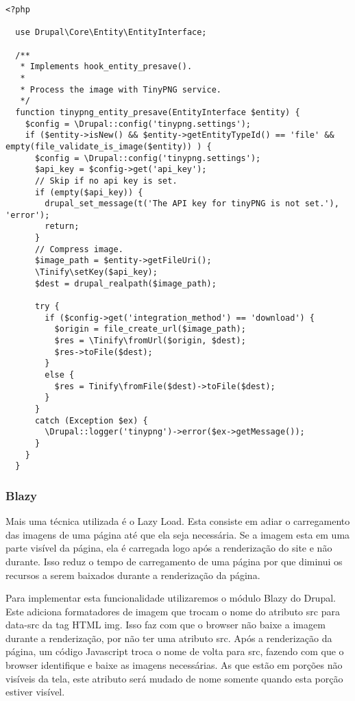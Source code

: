 \documentclass[
	12pt,				%
    oneside,			%
	a4paper,			%
	english,			%
	french,				%
	spanish,			%
	brazil				%
	]{abntex2}
\begin{document}
\lstset{language=PHP}
\begin{lstlisting}[frame=single]
  <?php

  use Drupal\Core\Entity\EntityInterface;

  /**
   * Implements hook_entity_presave().
   *
   * Process the image with TinyPNG service.
   */
  function tinypng_entity_presave(EntityInterface $entity) {
    $config = \Drupal::config('tinypng.settings');
    if ($entity->isNew() && $entity->getEntityTypeId() == 'file' && empty(file_validate_is_image($entity)) ) {
      $config = \Drupal::config('tinypng.settings');
      $api_key = $config->get('api_key');
      // Skip if no api key is set.
      if (empty($api_key)) {
        drupal_set_message(t('The API key for tinyPNG is not set.'), 'error');
        return;
      }
      // Compress image.
      $image_path = $entity->getFileUri();
      \Tinify\setKey($api_key);
      $dest = drupal_realpath($image_path);

      try {
        if ($config->get('integration_method') == 'download') {
          $origin = file_create_url($image_path);
          $res = \Tinify\fromUrl($origin, $dest);
          $res->toFile($dest);
        }
        else {
          $res = Tinify\fromFile($dest)->toFile($dest);
        }
      }
      catch (Exception $ex) {
        \Drupal::logger('tinypng')->error($ex->getMessage());
      }
    }
  }
\end{lstlisting}

\subsubsection{Blazy}
Mais uma técnica utilizada é o Lazy Load. Esta consiste em adiar o carregamento das imagens de uma página até que ela seja necessária. Se a imagem esta em uma parte visível da página, ela é carregada logo após a renderização do site e não durante. Isso reduz o tempo de carregamento de uma página por que diminui os recursos a serem baixados durante a renderização da página.

Para implementar esta funcionalidade utilizaremos o módulo Blazy do Drupal. Este adiciona formatadores de imagem que trocam o nome do atributo src para data-src da tag HTML img. Isso faz com que o browser não baixe a imagem durante a renderização, por não ter uma atributo src. Após a renderização da página, um código Javascript troca o nome de volta para src, fazendo com que o browser identifique e baixe as imagens necessárias. As que estão em porções não visíveis da tela, este atributo será mudado de nome somente quando esta porção estiver visível.
\end{document}
